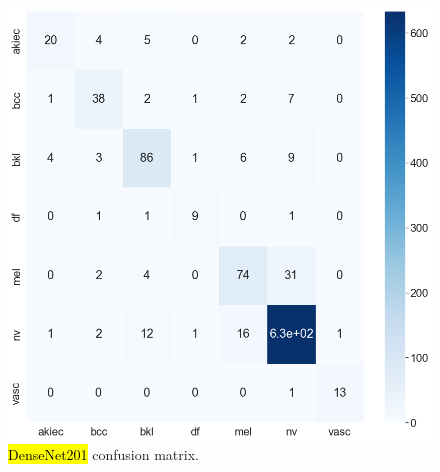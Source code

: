 \documentclass[sensors,article,accept,pdftex,moreauthors]{Definitions/mdpi}
\begin{document}
	\begin{figure}[H]
		\begin{minipage}{0.48\textwidth}
\centering
\includegraphics[width=1\linewidth]{Definitions/CM/dn201cm}
		\end{minipage}
\caption{\hl{DenseNet201} %
 confusion matrix.}\label{fig:densenet201cm}
		\end{figure}\unskip
		
\end{document}
